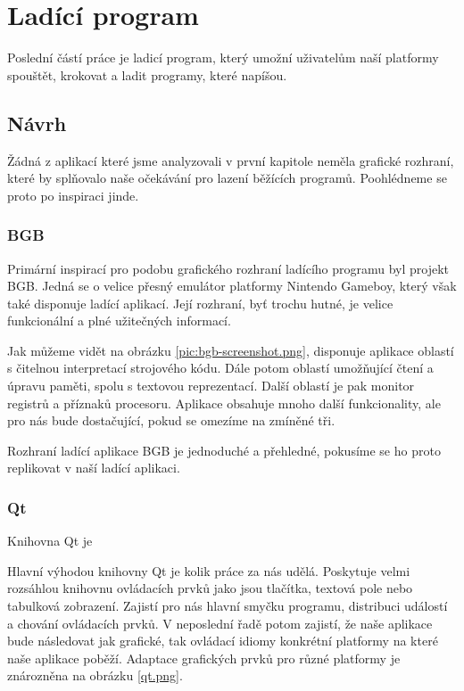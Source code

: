 \chapter{Ladící program}
\label{chap:debugger}

Poslední částí práce je ladicí program, který umožní uživatelům naší platformy spouštět, krokovat a ladit programy, které napíšou.

\section{Návrh}

Žádná z aplikací které jsme analyzovali v první kapitole neměla grafické rozhraní, které by splňovalo naše očekávání pro lazení běžících programů. Poohlédneme se proto po inspiraci jinde.

\subsection{BGB}

Primární inspirací pro podobu grafického rozhraní ladícího programu byl projekt BGB. Jedná se o velice přesný emulátor platformy Nintendo Gameboy\cite{bgb-website}, který však také disponuje ladící aplikací. Její rozhraní, byť trochu hutné, je velice funkcionální a plné užitečných informací.


Jak můžeme vidět na obrázku \ref{pic:bgb-screenshot.png}, disponuje aplikace oblastí s čitelnou interpretací strojového kódu. Dále potom oblastí umožňující čtení a úpravu paměti, spolu s textovou reprezentací. Další oblastí je pak monitor registrů a příznaků procesoru. Aplikace obsahuje mnoho další funkcionality, ale pro nás bude dostačující, pokud se omezíme na zmíněné tři.

Rozhraní ladící aplikace BGB je jednoduché a přehledné, pokusíme se ho proto replikovat v naší ladící aplikaci.

\subsection{Qt}
\label{sec:dbg-qt}

Knihovna Qt je 

Hlavní výhodou knihovny Qt je kolik práce za nás udělá. Poskytuje velmi rozsáhlou knihovnu ovládacích prvků jako jsou tlačítka, textová pole nebo tabulková zobrazení. Zajistí pro nás hlavní smyčku programu, distribuci událostí a chování ovládacích prvků. V neposlední řadě potom zajistí, že naše aplikace bude následovat jak grafické, tak ovládací idiomy konkrétní platformy na které naše aplikace poběží. Adaptace grafických prvků pro různé platformy je znározněna na obrázku \ref{qt.png}.

